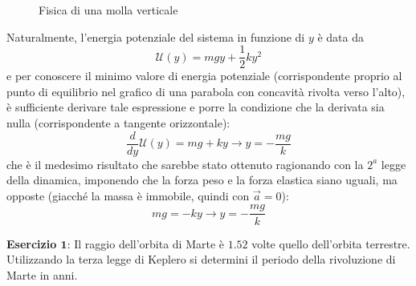 \documentclass[a4paper]{extarticle}
\begin{document}
\begin{figure}[H]
  \caption{Fisica di una molla verticale}
  \label{fig:fisica_molla_verticale}
\end{figure}

\noindent
Naturalmente, l'energia potenziale del sistema in funzione di $y$ è data da
\[\mathcal{U}(y) = mg y + \frac{1}{2} k y^2\]
e per conoscere il minimo valore di energia potenziale (corrispondente proprio al punto di equilibrio nel grafico di una parabola con concavità rivolta verso l'alto), è sufficiente derivare tale espressione e porre la condizione che la derivata sia nulla (corrispondente a tangente orizzontale):
\[\frac{d}{dy} \mathcal{U}(y) = mg + ky \longrightarrow y = -\frac{mg}{k}\]
che è il medesimo risultato che sarebbe stato ottenuto ragionando con la $2^a$ legge della dinamica, imponendo che la forza peso e la forza elastica siano uguali, ma opposte (giacché la massa è immobile, quindi con $\vec a = 0$):
\[mg=-ky \longrightarrow y = -\frac{mg}{k}\]

\vspace{1em}
\noindent
\textbf{Esercizio $\boldsymbol{1}$}: Il raggio dell'orbita di Marte è $1.52$ volte quello dell'orbita terrestre. Utilizzando la terza legge di Keplero si determini il periodo della rivoluzione di Marte in anni.
\end{document}
